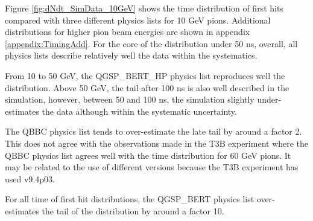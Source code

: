 Figure \ref{fig:dNdt_SimData_10GeV} shows the time distribution of first hits compared with three different physics lists for 10 GeV pions. Additional distributions for higher pion beam energies are shown in appendix \ref{appendix:TimingAdd}. For the core of the distribution under 50 ns, overall, all physics lists describe relatively well the data within the systematics.

From 10 to 50 GeV, the QGSP\_BERT\_HP physics list reproduces well the distribution. Above 50 GeV, the tail after 100 ns is also well described in the simulation, however, between 50 and 100 ns, the simulation slightly under-estimates the data although within the systematic uncertainty.

The QBBC physics list tends to over-estimate the late tail by around a factor 2. This does not agree with the observations made in the T3B experiment where the QBBC physics list agrees well with the time distribution for 60 GeV pions. It may be related to the use of different \geant versions because the T3B experiment has used \geant v9.4p03.

For all time of first hit distributions, the QGSP\_BERT physics list over-estimates the tail of the distribution by around a factor 10.


